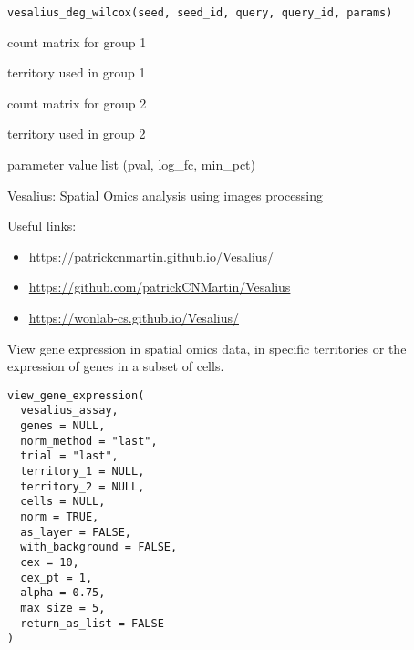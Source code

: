 \documentclass[a4paper]{book}
\begin{document}
%
\begin{Usage}
\begin{verbatim}
vesalius_deg_wilcox(seed, seed_id, query, query_id, params)
\end{verbatim}
\end{Usage}
%
\begin{Arguments}
\begin{ldescription}
\item[\code{seed}] count matrix for group 1

\item[\code{seed\_id}] territory used in group 1

\item[\code{query}] count matrix for group 2

\item[\code{query\_id}] territory used in group 2

\item[\code{params}] parameter value list (pval, log\_fc, min\_pct)
\end{ldescription}
\end{Arguments}
%
\begin{Description}
Vesalius: Spatial Omics analysis using images processing
\end{Description}
%
\begin{SeeAlso}
Useful links:
\begin{itemize}

\item{} \url{https://patrickcnmartin.github.io/Vesalius/}
\item{} \url{https://github.com/patrickCNMartin/Vesalius}
\item{} \url{https://wonlab-cs.github.io/Vesalius/}

\end{itemize}


\end{SeeAlso}
%
\begin{Description}
View gene expression in spatial omics data, in specific territories or
the expression of genes in a subset of cells.
\end{Description}
%
\begin{Usage}
\begin{verbatim}
view_gene_expression(
  vesalius_assay,
  genes = NULL,
  norm_method = "last",
  trial = "last",
  territory_1 = NULL,
  territory_2 = NULL,
  cells = NULL,
  norm = TRUE,
  as_layer = FALSE,
  with_background = FALSE,
  cex = 10,
  cex_pt = 1,
  alpha = 0.75,
  max_size = 5,
  return_as_list = FALSE
)
\end{verbatim}
\end{Usage}
\end{document}
